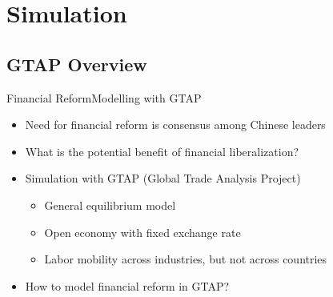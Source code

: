 \documentclass{beamer}
\begin{document}


\section{Simulation}
\subsection{GTAP Overview}
\begin{frame}{Financial Reform}{Modelling with GTAP}
\begin{itemize}
\item<1-> Need for financial reform is consensus among Chinese leaders 
\item<2-> What is the potential benefit of financial liberalization?
\item<3-> Simulation with GTAP (Global Trade Analysis Project) 
    \begin{itemize}
    \item General equilibrium model
    \item Open economy with fixed exchange rate
    \item Labor mobility across industries, but not across countries
    \end{itemize}
\item<4-> How to model financial reform in GTAP?
\end{itemize}   
\end{frame}
\end{document}
